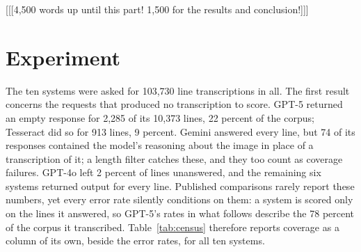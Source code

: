 \documentclass{anthology-ch}         %
\begin{document}
[[[4,500 words up until this part! 1,500 for the results and conclusion!]]]

\section{Experiment}\label{sec:experiments}

The ten systems were asked for 103,730 line transcriptions in all. The first result concerns the requests that produced no transcription to score. GPT-5 returned an empty response for 2,285 of its 10,373 lines, 22 percent of the corpus; Tesseract did so for 913 lines, 9 percent. Gemini answered every line, but 74 of its responses contained the model's reasoning about the image in place of a transcription of it; a length filter catches these, and they too count as coverage failures. GPT-4o left 2 percent of lines unanswered, and the remaining six systems returned output for every line. Published comparisons rarely report these numbers, yet every error rate silently conditions on them: a system is scored only on the lines it answered, so GPT-5's rates in what follows describe the 78 percent of the corpus it transcribed. Table~\ref{tab:census} therefore reports coverage as a column of its own, beside the error rates, for all ten systems.
\end{document}

